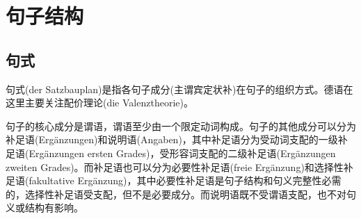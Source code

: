 \section{句子结构}

\subsection{句式}

句式(der Satzbauplan)是指各句子成分(主谓宾定状补)在句子的组织方式。德语在这里主要关注配价理论(die Valenztheorie)。

句子的核心成分是谓语，谓语至少由一个限定动词构成。句子的其他成分可以分为补足语(Ergänzungen)和说明语(Angaben)，其中补足语分为受动词支配的一级补足语(Ergänzungen ersten Grades)，受形容词支配的二级补足语(Ergänzungen zweiten Grades)。而补足语也可以分为必要性补足语(freie Ergänzung)和选择性补足语(fakultative Ergänzung)，其中必要性补足语是句子结构和句义完整性必需的，选择性补足语受支配，但不是必要成分。而说明语既不受谓语支配，也不对句义或结构有影响。

